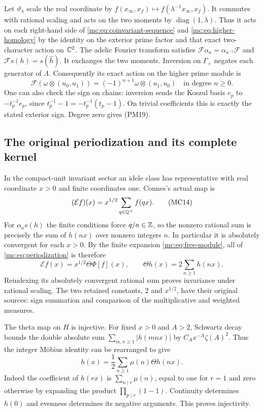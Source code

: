 Let $\vartheta_\lambda$ scale the real coordinate by
$f(x_\infty,x_f)\mapsto f(\lambda^{-1}x_\infty,x_f)$.
It commutes with rational scaling and acts on the two moments by
$\operatorname{diag}(1,\lambda)$. Thus it acts on each right-hand
side of \eqref{mc:eq:coinvariant-sequence} and
\eqref{mc:eq:higher-homology} by the identity on the exterior prime
factor and that exact two-character action on $\mathbb C^2$.
The adelic Fourier transform satisfies
$\mathcal F\alpha_a=\alpha_{a^{-1}}\mathcal F$ and
$\mathcal Fs(h)=s(\widehat h)$. It exchanges the two moments.
Inversion on $\Gamma_+$ negates each generator of $\Lambda$.
Consequently its exact action on the higher prime module is
\[
 \mathcal F(\omega\otimes(u_0,u_1))
       =(-1)^{n+1}\omega\otimes(u_1,u_0)
 \quad\text{in degree }n\ge0.
 \tag{MC13}\label{mc:eq:higher-fourier}
\]
One can also check the sign on chains: inversion sends the Koszul
basis $e_p$ to $-t_p^{-1}e_p$, since
$t_p^{-1}-1=-t_p^{-1}(t_p-1)$. On trivial coefficients this is
exactly the stated exterior sign. Degree zero gives (PM19).

\subsection{The original periodization and its complete kernel}

In the compact-unit invariant sector an idele class has representative
with real coordinate $x>0$ and finite coordinates one. Connes's
actual map is
\[
 (\mathcal Ef)(x)=x^{1/2}\sum_{q\in\mathbb Q^\times}f(qx).
 \tag{MC14}\label{mc:eq:periodization}
\]
For $\alpha_as(h)$ the finite conditions force $q/a\in\mathbb Z$, so
the nonzero rational sum is precisely the sum of $h(nx)$ over
nonzero integers $n$. In particular it is absolutely convergent
for each $x>0$. By the finite expansion \eqref{mc:eq:free-module},
all of \eqref{mc:eq:periodization} is therefore
\[
 \mathcal Ef(x)=x^{1/2}\Theta\Phi[f](x),\qquad
 \Theta h(x)=2\sum_{n\ge1}h(nx).
 \tag{MC15}\label{mc:eq:theta}
\]
Reindexing its absolutely convergent rational sum proves invariance
under rational scaling. The two retained constants, $2$ and
$x^{1/2}$, have their original sources: sign summation and comparison
of the multiplicative and weighted measures.

The theta map on $H$ is injective. For fixed $x>0$ and $A>2$,
Schwartz decay bounds the double absolute sum
$\sum_{m,n\ge1}|h(mnx)|$ by $C_Ax^{-A}\zeta(A)^2$. Thus the
integer M\"obius identity can be rearranged to give
\[
 h(x)=\frac12\sum_{n\ge1}\mu(n)\Theta h(nx).
 \tag{MC16}\label{mc:eq:mobius}
\]
Indeed the coefficient of $h(rx)$ is $\sum_{n\mid r}\mu(n)$,
equal to one for $r=1$ and zero otherwise by expanding the product
$\prod_{p\mid r}(1-1)$. Continuity determines $h(0)$ and evenness
determines its negative arguments. This proves injectivity.

